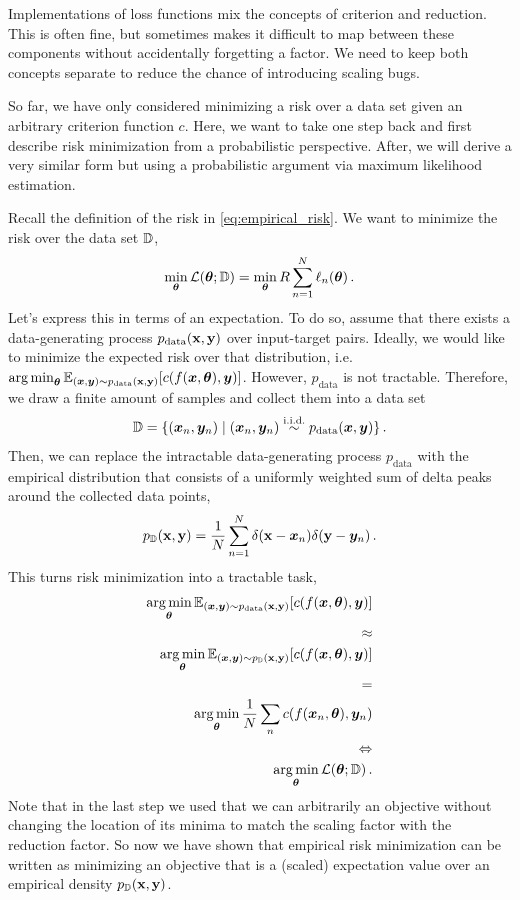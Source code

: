 \begin{caveat}
  Implementations of loss functions mix the concepts of criterion and reduction.
  This is often fine, but sometimes makes it difficult to map between these components without accidentally forgetting a factor.
  We need to keep both concepts separate to reduce the chance of introducing scaling bugs.
\end{caveat}

So far, we have only considered minimizing a risk over a data set given an arbitrary criterion function $c$.
Here, we want to take one step back and first describe risk minimization from a probabilistic perspective.
After, we will derive a very similar form but using a probabilistic argument via maximum likelihood estimation.

Recall the definition of the risk in \cref{eq:empirical_risk}.
We want to minimize the risk over the data set ${\mathbb{D}}$,
\begin{align*}
  \min_{{\bm{\theta}}} {\mathcal{L}}({\bm{\theta}}; {\mathbb{D}}) = \min_{{\bm{\theta}}} R \sum_{n=1}^N \ell_n({\bm{\theta}})\,.
\end{align*}
Let's express this in terms of an expectation.
To do so, assume that there exists a data-generating process $p_{\text{data}}({\mathbf{x}}, {\mathbf{y}})$ over input-target pairs.
Ideally, we would like to minimize the expected risk over that distribution, i.e.\,$\operatorname*{arg\,min}_{{\bm{\theta}}} \mathbb{E}_{({\bm{x}}, {\bm{y}}) \sim p_{\text{data}}({\mathbf{x}}, {\mathbf{y}})}[c(f({\bm{x}}, {\bm{\theta}}), {\bm{y}})]$.
However, $p_{\text{data}}$ is not tractable.
Therefore, we draw a finite amount of samples and collect them into a data set
\begin{align*}
  {\mathbb{D}} = \{ ({\bm{x}}_n, {\bm{y}}_n) \mid ({\bm{x}}_n, {\bm{y}}_n) \stackrel{\text{i.i.d.}}{\sim} p_{\text{data}}({\bm{x}}, {\bm{y}}) \}\,.
\end{align*}
Then, we can replace the intractable data-generating process $p_{\text{data}}$ with the empirical distribution that consists of a uniformly weighted sum of delta peaks around the collected data points,
\begin{align*}
  p_{{\mathbb{D}}}({\mathbf{x}}, {\mathbf{y}}) = \frac{1}{N} \sum_{n=1}^N \delta({\mathbf{x}} - {\bm{x}}_n) \delta({\mathbf{y}} - {\bm{y}}_n)\,.
\end{align*}
This turns risk minimization into a tractable task,
\begin{align*}
  \operatorname*{arg\,min}_{{\bm{\theta}}} \mathbb{E}_{({\bm{x}}, {\bm{y}}) \sim p_{\text{data}}({\mathbf{x}}, {\mathbf{y}})}[c(f({\bm{x}}, {\bm{\theta}}), {\bm{y}})]
  \\
  \approx
  \\
  \operatorname*{arg\,min}_{{\bm{\theta}}} \mathbb{E}_{({\bm{x}}, {\bm{y}}) \sim p_{{\mathbb{D}}}({\mathbf{x}}, {\mathbf{y}})}[c(f({\bm{x}}, {\bm{\theta}}), {\bm{y}})]
  \\
  =
  \\
  \operatorname*{arg\,min}_{{\bm{\theta}}} \frac{1}{N} \sum_n c(f({\bm{x}}_n, {\bm{\theta}}), {\bm{y}}_n)
  \\
  \Leftrightarrow
  \\
  \operatorname*{arg\,min}_{{\bm{\theta}}} {\mathcal{L}}({\bm{\theta}}; {\mathbb{D}})\,.
\end{align*}
Note that in the last step we used that we can arbitrarily an objective without changing the location of its minima to match the scaling factor with the reduction factor.
So now we have shown that empirical risk minimization can be written as minimizing an objective that is a (scaled) expectation value over an empirical density $p_{{\mathbb{D}}}({\mathbf{x}}, {\mathbf{y}})$.

